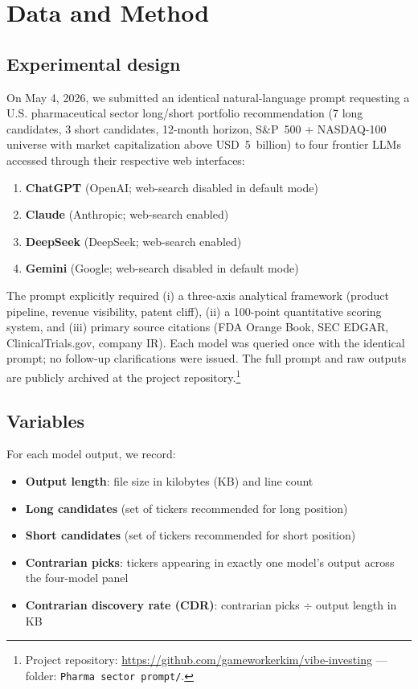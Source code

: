 \documentclass[11pt,letterpaper]{article}
\begin{document}
\section{Data and Method}\label{sec:data}

\subsection{Experimental design}

On May 4, 2026, we submitted an identical natural-language prompt requesting a U.S. pharmaceutical sector long/short portfolio recommendation (7 long candidates, 3 short candidates, 12-month horizon, S\&P~500 + NASDAQ-100 universe with market capitalization above USD~5~billion) to four frontier LLMs accessed through their respective web interfaces:

\begin{enumerate}\setlength\itemsep{2pt}
\item \textbf{ChatGPT} (OpenAI; web-search disabled in default mode)
\item \textbf{Claude} (Anthropic; web-search enabled)
\item \textbf{DeepSeek} (DeepSeek; web-search enabled)
\item \textbf{Gemini} (Google; web-search disabled in default mode)
\end{enumerate}

The prompt explicitly required (i) a three-axis analytical framework (product pipeline, revenue visibility, patent cliff), (ii) a 100-point quantitative scoring system, and (iii) primary source citations (FDA Orange Book, SEC EDGAR, ClinicalTrials.gov, company IR). Each model was queried once with the identical prompt; no follow-up clarifications were issued. The full prompt and raw outputs are publicly archived at the project repository.\footnote{Project repository: \url{https://github.com/gameworkerkim/vibe-investing} --- folder: \texttt{Pharma sector prompt/}.}

\subsection{Variables}

For each model output, we record:

\begin{itemize}\setlength\itemsep{2pt}
\item \textbf{Output length}: file size in kilobytes (KB) and line count
\item \textbf{Long candidates} (set of tickers recommended for long position)
\item \textbf{Short candidates} (set of tickers recommended for short position)
\item \textbf{Contrarian picks}: tickers appearing in exactly one model's output across the four-model panel
\item \textbf{Contrarian discovery rate (CDR)}: contrarian picks $\div$ output length in KB
\end{itemize}
\end{document}
